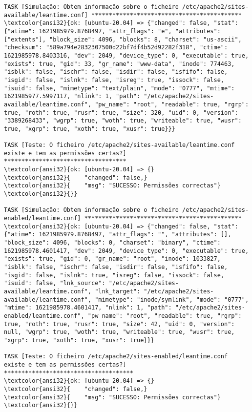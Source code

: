 \documentclass{scrartcl}
\begin{document}
\begin{Verbatim}
TASK [Simulação: Obtem informação sobre o ficheiro /etc/apache2/sites-available/leantime.conf] *******************************************
\textcolor{ansi32}{ok: [ubuntu-20.04] => {"changed": false, "stat": {"atime": 1621985979.8768497, "attr_flags": "e", "attributes": ["extents"], "block_size": 4096, "blocks": 8, "charset": "us-ascii", "checksum": "589a794e2832307500d22bf7df4b52d92282f318", "ctime": 1621985978.8403316, "dev": 2049, "device_type": 0, "executable": true, "exists": true, "gid": 33, "gr_name": "www-data", "inode": 774463, "isblk": false, "ischr": false, "isdir": false, "isfifo": false, "isgid": false, "islnk": false, "isreg": true, "issock": false, "isuid": false, "mimetype": "text/plain", "mode": "0777", "mtime": 1621985977.5997117, "nlink": 1, "path": "/etc/apache2/sites-available/leantime.conf", "pw_name": "root", "readable": true, "rgrp": true, "roth": true, "rusr": true, "size": 320, "uid": 0, "version": "3389268433", "wgrp": true, "woth": true, "writeable": true, "wusr": true, "xgrp": true, "xoth": true, "xusr": true}}}

TASK [Teste: O ficheiro /etc/apache2/sites-available/leantime.conf existe e tem as permissões certas?] ***********************************
\textcolor{ansi32}{ok: [ubuntu-20.04] => {}
\textcolor{ansi32}{    "changed": false,}
\textcolor{ansi32}{    "msg": "SUCESSO: Permissões correctas"}
\textcolor{ansi32}{}}

TASK [Simulação: Obtem informação sobre o ficheiro /etc/apache2/sites-enabled/leantime.conf] *********************************************
\textcolor{ansi32}{ok: [ubuntu-20.04] => {"changed": false, "stat": {"atime": 1621985979.8768497, "attr_flags": "", "attributes": [], "block_size": 4096, "blocks": 0, "charset": "binary", "ctime": 1621985978.4601417, "dev": 2049, "device_type": 0, "executable": true, "exists": true, "gid": 0, "gr_name": "root", "inode": 1033827, "isblk": false, "ischr": false, "isdir": false, "isfifo": false, "isgid": false, "islnk": true, "isreg": false, "issock": false, "isuid": false, "lnk_source": "/etc/apache2/sites-available/leantime.conf", "lnk_target": "/etc/apache2/sites-available/leantime.conf", "mimetype": "inode/symlink", "mode": "0777", "mtime": 1621985978.4601417, "nlink": 1, "path": "/etc/apache2/sites-enabled/leantime.conf", "pw_name": "root", "readable": true, "rgrp": true, "roth": true, "rusr": true, "size": 42, "uid": 0, "version": null, "wgrp": true, "woth": true, "writeable": true, "wusr": true, "xgrp": true, "xoth": true, "xusr": true}}}

TASK [Teste: O ficheiro /etc/apache2/sites-enabled/leantime.conf existe e tem as permissões certas?] *************************************
\textcolor{ansi32}{ok: [ubuntu-20.04] => {}
\textcolor{ansi32}{    "changed": false,}
\textcolor{ansi32}{    "msg": "SUCESSO: Permissões correctas"}
\textcolor{ansi32}{}}


\end{Verbatim}
\end{document}
